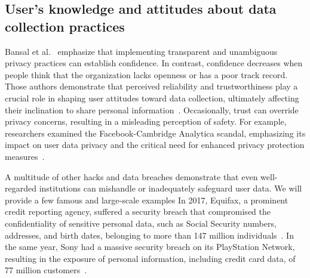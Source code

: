\subsection{User's knowledge and attitudes about data collection practices}


Bansal et al.~\cite{bansal2010impact} emphasize that implementing transparent and unambiguous privacy practices can establish confidence.
In contrast, confidence decreases when people think that the organization lacks openness or has a poor track record.
Those authors demonstrate that perceived reliability and trustworthiness play a crucial role in shaping user attitudes toward data collection, ultimately affecting their inclination to share personal information~\cite{bansal2010impact}.
Occasionally, trust can override privacy concerns, resulting in a misleading perception of safety.
For example, researchers examined the Facebook-Cambridge Analytica scandal, emphasizing its impact on user data privacy and the critical need for enhanced privacy protection measures~\cite{isaak2018user}.

A multitude of other hacks and data breaches demonstrate that even well-regarded institutions can mishandle or inadequately safeguard user data.
We will provide a few famous and large-scale examples
In 2017, Equifax, a prominent credit reporting agency, suffered a security breach that compromised the confidentiality of sensitive personal data, such as Social Security numbers, addresses, and birth dates, belonging to more than 147 million individuals~\cite{bernard2017equifax}.
In the same year, Sony had a massive security breach on its PlayStation Network, resulting in the exposure of personal information, including credit card data, of 77 million customers~\cite{wilton2017sony}. 

